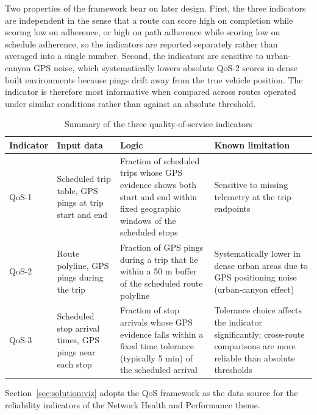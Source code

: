 Two properties of the framework bear on later design. First, the three
indicators are independent in the sense that a route can score high on
completion while scoring low on adherence, or high on path adherence
while scoring low on schedule adherence, so the indicators are reported
separately rather than averaged into a single number. Second, the
indicators are sensitive to urban-canyon GPS noise, which systematically
lowers absolute QoS-2 scores in dense built environments because pings
drift away from the true vehicle position. The indicator is therefore
most informative when compared across routes operated under similar
conditions rather than against an absolute threshold.

\begin{table}[!htbp]
\centering
\caption{Summary of the three quality-of-service indicators}
\label{tab:foundations:qos}
\footnotesize
\renewcommand{\arraystretch}{1.20}
\begin{tabularx}{\linewidth}{p{1.4cm}p{2.8cm}Xp{3.2cm}}
\hline
\textbf{Indicator} & \textbf{Input data} & \textbf{Logic} & \textbf{Known limitation} \\
\hline
QoS-1 & Scheduled trip table, GPS pings at trip start and end & Fraction of scheduled trips whose GPS evidence shows both start and end within fixed geographic windows of the scheduled stops & Sensitive to missing telemetry at the trip endpoints \\
QoS-2 & Route polyline, GPS pings during the trip & Fraction of GPS pings during a trip that lie within a 50 m buffer of the scheduled route polyline & Systematically lower in dense urban areas due to GPS positioning noise (urban-canyon effect) \\
QoS-3 & Scheduled stop arrival times, GPS pings near each stop & Fraction of stop arrivals whose GPS evidence falls within a fixed time tolerance (typically 5 min) of the scheduled arrival & Tolerance choice affects the indicator significantly; cross-route comparisons are more reliable than absolute thresholds \\
\hline
\end{tabularx}
\end{table}

Section~\ref{sec:solution:viz} adopts the QoS framework as the data source
for the reliability indicators of the Network Health and Performance theme.
